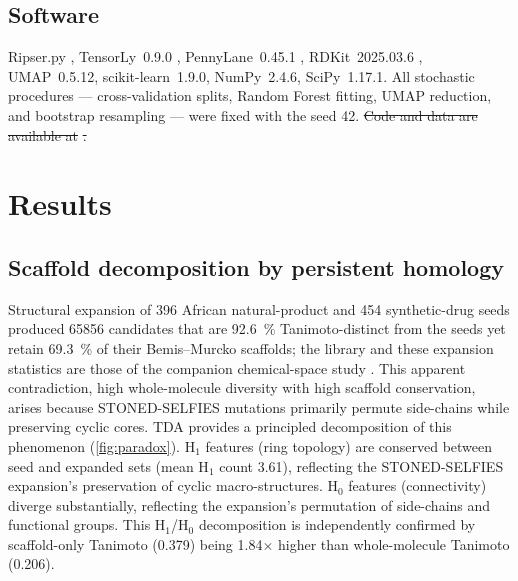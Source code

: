\documentclass[11pt,a4paper]{article}
\providecommand{\DIFdeltex}[1]{{\protect\color{red}\sout{#1}}}                      %
\providecommand{\DIFaddbegin}{} %
\providecommand{\DIFaddend}{} %
\providecommand{\DIFdelbegin}{} %
\providecommand{\DIFdelend}{} %
\providecommand{\DIFdel}[1]{\texorpdfstring{\DIFdeltex{#1}}{}} %
\newcommand{\DIFscaledelfig}{0.5}
\newlength{\DIFdelgraphicswidth} %
\newlength{\DIFdelgraphicsheight} %
\newcommand{\DIFaddincludegraphics}[2][]{{\color{blue}\fbox{\DIFOincludegraphics[#1]{#2}}}} %
\newcommand{\DIFdelincludegraphics}[2][]{%
\sbox{\DIFdelgraphicsbox}{\DIFOincludegraphics[#1]{#2}}%
\settoboxwidth{\DIFdelgraphicswidth}{\DIFdelgraphicsbox} %
\settoboxtotalheight{\DIFdelgraphicsheight}{\DIFdelgraphicsbox} %
\scalebox{\DIFscaledelfig}{%
\parbox[b]{\DIFdelgraphicswidth}{\usebox{\DIFdelgraphicsbox}\\[-\baselineskip] \rule{\DIFdelgraphicswidth}{0em}}\llap{\resizebox{\DIFdelgraphicswidth}{\DIFdelgraphicsheight}{%
\setlength{\unitlength}{\DIFdelgraphicswidth}%
\begin{picture}(1,1)%
\thicklines\linethickness{2pt} %
{\color[rgb]{1,0,0}\put(0,0){\framebox(1,1){}}}%
{\color[rgb]{1,0,0}\put(0,0){\line( 1,1){1}}}%
{\color[rgb]{1,0,0}\put(0,1){\line(1,-1){1}}}%
\end{picture}%
}\hspace*{3pt}}} %
} %
\DeclareRobustCommand{\DIFaddbegin}{\DIFOaddbegin \let\includegraphics\DIFaddincludegraphics} %
\DeclareRobustCommand{\DIFaddend}{\DIFOaddend \let\includegraphics\DIFOincludegraphics} %
\DeclareRobustCommand{\DIFdelbegin}{\DIFOdelbegin \let\includegraphics\DIFdelincludegraphics} %
\DeclareRobustCommand{\DIFdelend}{\DIFOaddend \let\includegraphics\DIFOincludegraphics} %
\begin{document}
\subsection{Software}

Ripser.py \citep{ripser_2019}, TensorLy~0.9.0 \citep{tensorly_2019}, PennyLane~0.45.1 \citep{pennylane_2024}, RDKit~2025.03.6 \citep{rdkit_2024}, UMAP~0.5.12, scikit-learn~1.9.0, NumPy~2.4.6, SciPy~1.17.1. All stochastic procedures --- cross-validation splits, Random Forest fitting, UMAP reduction, and bootstrap resampling --- were fixed with the seed \num{42}.
\DIFdelbegin \DIFdel{Code and data are available at }%
\DIFdel{.
}\DIFdelend 


\section{Results}\DIFaddbegin \label{sec:results}
\DIFaddend 

\subsection{Scaffold decomposition by persistent homology}

Structural expansion of \num{396} African natural-product and \num{454} synthetic-drug seeds produced \num{65856} candidates that are \qty{92.6}{\percent} Tanimoto-distinct from the seeds yet retain \qty{69.3}{\percent} of their Bemis--Murcko scaffolds; the library and these expansion statistics are those of the companion chemical-space study \citep{temgoua2026antimalarial}. This apparent contradiction, high whole-molecule diversity with high scaffold conservation, arises because STONED-SELFIES mutations primarily permute side-chains while preserving cyclic cores. TDA provides a principled decomposition of this phenomenon (\cref{fig:paradox}). H$_1$ features (ring topology) are conserved between seed and expanded sets (mean H$_1$ count \num{3.61}), reflecting the STONED-SELFIES expansion's preservation of cyclic macro-structures. H$_0$ features (connectivity) diverge substantially, reflecting the expansion's permutation of side-chains and functional groups. This H$_1$/H$_0$ decomposition is independently confirmed by scaffold-only Tanimoto (\num{0.379}) being \num{1.84}$\times$ higher than whole-molecule Tanimoto (\num{0.206}).
\end{document}
